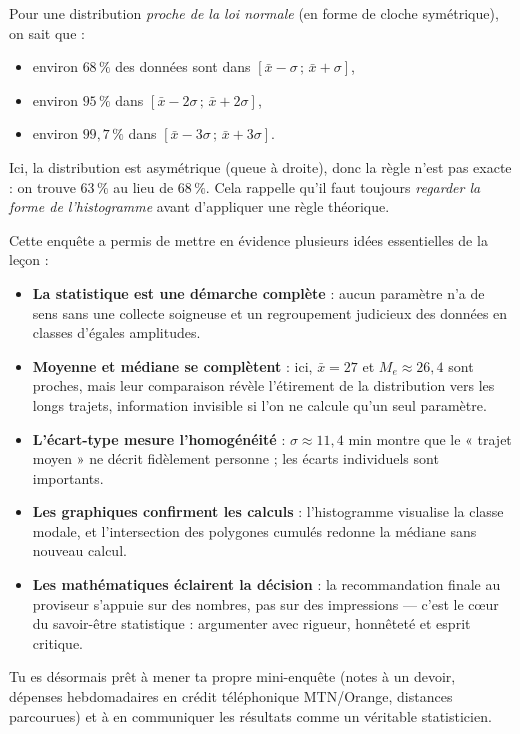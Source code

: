 \documentclass[11pt]{article}
\newcounter{popsec}
\newcounter{popsub}
\newcommand{\courssub}[1]{%
  \stepcounter{popsub}%
  \par\vspace{9pt}\noindent{\popxbold\fontsize{11.5}{13}\selectfont\color{popink}{\color{poporange}\thepopsec.\thepopsub}\hspace{6pt}#1}\par\nopagebreak\vspace{4pt}
}
\begin{document}
\begin{savaistu}
Pour une distribution \emph{proche de la loi normale} (en forme de cloche symétrique), on sait que :
\begin{itemize}
\item environ $68\,\%$ des données sont dans $[\bar{x}-\sigma\,;\,\bar{x}+\sigma]$,
\item environ $95\,\%$ dans $[\bar{x}-2\sigma\,;\,\bar{x}+2\sigma]$,
\item environ $99,7\,\%$ dans $[\bar{x}-3\sigma\,;\,\bar{x}+3\sigma]$.
\end{itemize}
Ici, la distribution est asymétrique (queue à droite), donc la règle n'est pas exacte : on trouve $63\,\%$ au lieu de $68\,\%$. Cela rappelle qu'il faut toujours \emph{regarder la forme de l'histogramme} avant d'appliquer une règle théorique.
\end{savaistu}

\courssub{Bilan de l'activité}

Cette enquête a permis de mettre en évidence plusieurs idées essentielles de la leçon :

\begin{itemize}
\item \textbf{La statistique est une démarche complète} : aucun paramètre n'a de sens sans une collecte soigneuse et un regroupement judicieux des données en classes d'égales amplitudes.
\item \textbf{Moyenne et médiane se complètent} : ici, $\bar{x}=27$ et $M_e\approx 26,4$ sont proches, mais leur comparaison révèle l'étirement de la distribution vers les longs trajets, information invisible si l'on ne calcule qu'un seul paramètre.
\item \textbf{L'écart-type mesure l'homogénéité} : $\sigma\approx 11,4$ min montre que le « trajet moyen » ne décrit fidèlement personne ; les écarts individuels sont importants.
\item \textbf{Les graphiques confirment les calculs} : l'histogramme visualise la classe modale, et l'intersection des polygones cumulés redonne la médiane sans nouveau calcul.
\item \textbf{Les mathématiques éclairent la décision} : la recommandation finale au proviseur s'appuie sur des nombres, pas sur des impressions — c'est le cœur du savoir-être statistique : argumenter avec rigueur, honnêteté et esprit critique.
\end{itemize}

Tu es désormais prêt à mener ta propre mini-enquête (notes à un devoir, dépenses hebdomadaires en crédit téléphonique MTN/Orange, distances parcourues) et à en communiquer les résultats comme un véritable statisticien.
\end{document}
